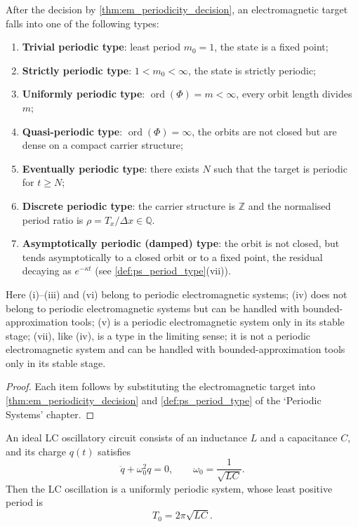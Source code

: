 \begin{corollary}\label{cor:em_period_type}
After the decision by \cref{thm:em_periodicity_decision}, an electromagnetic target falls into one of the following types:
\begin{enumerate}[label=(\roman*)]
    \item \textbf{Trivial periodic type}: least period $m_0=1$, the state is a fixed point;
    \item \textbf{Strictly periodic type}: $1<m_0<\infty$, the state is strictly periodic;
    \item \textbf{Uniformly periodic type}: $\operatorname{ord}(\Phi)=m<\infty$, every orbit length divides $m$;
    \item \textbf{Quasi-periodic type}: $\operatorname{ord}(\Phi)=\infty$, the orbits are not closed but are dense on a compact carrier structure;
    \item \textbf{Eventually periodic type}: there exists $N$ such that the target is periodic for $t\ge N$;
    \item \textbf{Discrete periodic type}: the carrier structure is $\mathbb Z$ and the normalised period ratio is $\rho=T_x/\Delta x\in\mathbb Q$.
    \item \textbf{Asymptotically periodic (damped) type}: the orbit is not closed, but tends asymptotically to a closed orbit or to a fixed point, the residual decaying as $e^{-\kappa t}$ (see \cref{def:ps_period_type}(vii)).
\end{enumerate}
Here (i)--(iii) and (vi) belong to periodic electromagnetic systems; (iv) does not belong to periodic electromagnetic systems but can be handled with bounded-approximation tools; (v) is a periodic electromagnetic system only in its stable stage; (vii), like (iv), is a type in the limiting sense; it is not a periodic electromagnetic system and can be handled with bounded-approximation tools only in its stable stage.
\end{corollary}

\begin{proof}
Each item follows by substituting the electromagnetic target into \cref{thm:em_periodicity_decision} and \cref{def:ps_period_type} of the `Periodic Systems' chapter.
\end{proof}

\begin{lemma}\label{lem:lc_periodic}
An ideal LC oscillatory circuit consists of an inductance $L$ and a capacitance $C$, and its charge $q(t)$ satisfies
\[
\ddot q+\omega_0^2q=0,\qquad \omega_0=\frac{1}{\sqrt{LC}}.
\]
Then the LC oscillation is a uniformly periodic system, whose least positive period is
\[
T_0=2\pi\sqrt{LC}.
\]
\end{lemma}

